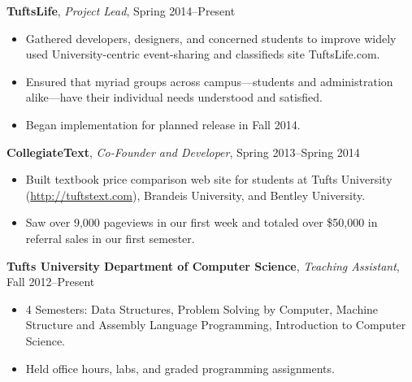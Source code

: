 \documentclass[10pt, letter]{article}
\newenvironment{list1}{
  \begin{list}{\ding{113}}{%
      \setlength{\itemsep}{0in}
      \setlength{\parsep}{0in} \setlength{\parskip}{0in}
      \setlength{\topsep}{0in} \setlength{\partopsep}{0in} 
      \setlength{\leftmargin}{0.17in}}}{\end{list}}
\begin{document}
\vspace{6pt}
{\bf TuftsLife}, \emph{Project Lead}, Spring 2014--Present\\
\vspace*{-.15in}
\begin{itemize}[topsep=0pt, itemsep=-1pt]
\item Gathered developers, designers, and concerned students to improve widely used University-centric event-sharing and classifieds site TuftsLife.com.
\item Ensured that myriad groups across campus---students and administration alike---have their individual needs understood and satisfied.
\item Began implementation for planned release in Fall 2014.
\end{itemize}
\vspace{6pt}
{\bf CollegiateText}, {\em Co-Founder and Developer}, Spring 2013--Spring 2014\\
\vspace*{-.15in}
\begin{itemize}[topsep=0pt,itemsep=-1pt]
            \item Built textbook price comparison web site for students at Tufts University (\url{http://tuftstext.com}), Brandeis University, and Bentley University.
            \item Saw over 9,000 pageviews in our first week and totaled over \$50,000 in referral sales in our first semester.
        \end{itemize}
\vspace{6pt}
{\bf Tufts University Department of Computer Science}, {\em Teaching Assistant}, Fall 2012--Present\\
\vspace*{-.15in}
\begin{itemize}[topsep=0pt,itemsep=-1pt]
  \item 4 Semesters: Data Structures, Problem Solving by Computer, Machine Structure and Assembly Language Programming, Introduction to Computer Science.
  \item Held office hours, labs, and graded programming assignments.
\end{itemize}
\end{document}

